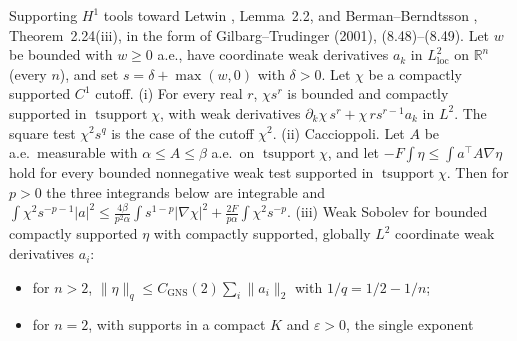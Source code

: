 \begin{lemma}
  \label{lem:letwin-h1-energy-sobolev}
  \leanok
  Supporting $H^1$ tools toward Letwin \cite{Letwin2026QuadraticKLS}, Lemma~2.2, and Berman--Berndtsson
  \cite{BermanBerndtsson2013RealMA}, Theorem~2.24(iii), in the form of Gilbarg--Trudinger (2001), (8.48)--(8.49).
  Let $w$ be bounded with $w\ge0$ a.e., have coordinate weak derivatives $a_k$ in $L^2_{\mathrm{loc}}$ on
  $\mathbb R^n$ (every $n$), and set $s=\delta+\max(w,0)$ with $\delta>0$. Let $\chi$ be a compactly supported $C^1$ cutoff.
  (i) For every real $r$, $\chi s^r$ is bounded and compactly supported in $\operatorname{tsupport}\chi$, with weak
  derivatives $\partial_k\chi\,s^r+\chi\,r s^{r-1}a_k$ in $L^2$. The square test $\chi^2 s^q$ is the case of the cutoff
  $\chi^2$.
  (ii) Caccioppoli. Let $A$ be a.e.\ measurable with $\alpha\le A\le\beta$ a.e.\ on $\operatorname{tsupport}\chi$, and let
  $-F\int\eta\le\int a^{\top}A\nabla\eta$ hold for every bounded nonnegative weak test supported in
  $\operatorname{tsupport}\chi$. Then for $p>0$ the three integrands below are integrable and
  $\int\chi^2 s^{-p-1}|a|^2\le\frac{4\beta}{p^2\alpha}\int s^{1-p}|\nabla\chi|^2+\frac{2F}{p\alpha}\int\chi^2 s^{-p}$.
  (iii) Weak Sobolev for bounded compactly supported $\eta$ with compactly supported, globally $L^2$ coordinate weak
  derivatives $a_i$:
  \begin{itemize}
    \item for $n>2$, $\|\eta\|_q\le C_{\mathrm{GNS}}(2)\sum_i\|a_i\|_2$ with $1/q=1/2-1/n$;
    \item for $n=2$, with supports in a compact $K$ and $\varepsilon>0$, the single exponent

\end{itemize}
\end{lemma}
